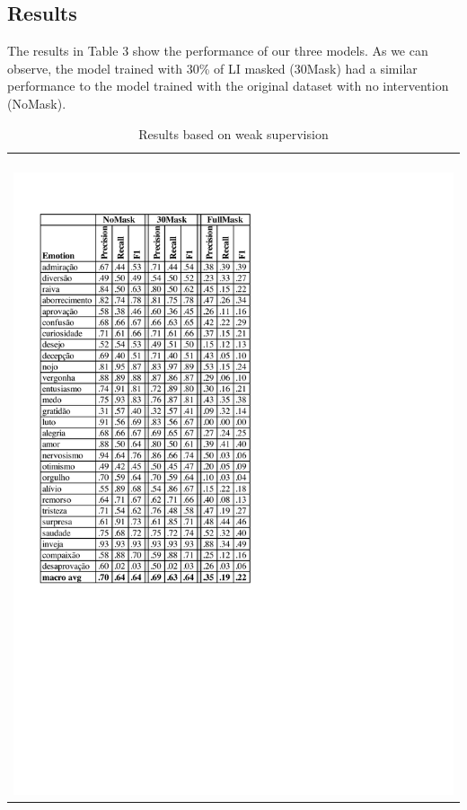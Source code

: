 \documentclass[12pt]{article}
\begin{document}
\subsection{Results}

The results in Table 3 show the performance of our three models. As we can observe, the model trained with 30\% of LI masked (30Mask) had a similar performance to the model trained with the original dataset with no intervention (NoMask).

\begin{table}[ht]
  \label{tab:results-weak-supervision}
  \caption{Results based on weak supervision}
  \begin{tabularx}{\textwidth}{X}
    \centering
    \includegraphics[trim=0.2cm 9.8cm 9.6cm 1.5cm, clip, scale=0.7]{img-n-tables/resultados.pdf}
  \end{tabularx}
\end{table}
\end{document}
